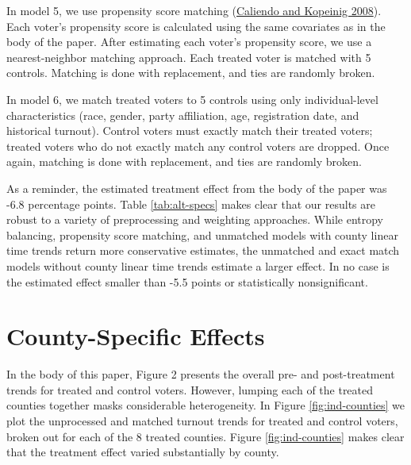 \documentclass[
  12pt,
]{article}
\begin{document}
In model 5, we use propensity score matching (\protect\hyperlink{ref-Caliendo2008}{Caliendo and Kopeinig 2008}). Each voter's propensity score is calculated using the same covariates as in the body of the paper. After estimating each voter's propensity score, we use a nearest-neighbor matching approach. Each treated voter is matched with 5 controls. Matching is done with replacement, and ties are randomly broken.

In model 6, we match treated voters to 5 controls using only individual-level characteristics (race, gender, party affiliation, age, registration date, and historical turnout). Control voters must exactly match their treated voters; treated voters who do not exactly match any control voters are dropped. Once again, matching is done with replacement, and ties are randomly broken.

As a reminder, the estimated treatment effect from the body of the paper was -6.8 percentage points. Table \ref{tab:alt-specs} makes clear that our results are robust to a variety of preprocessing and weighting approaches. While entropy balancing, propensity score matching, and unmatched models with county linear time trends return more conservative estimates, the unmatched and exact match models without county linear time trends estimate a larger effect. In no case is the estimated effect smaller than -5.5 points or statistically nonsignificant.

\newpage
\begin{landscape}
\begin{singlespace}

\end{singlespace}
\end{landscape}

\hypertarget{county-specific-effects}{%
\section*{County-Specific Effects}\label{county-specific-effects}}

In the body of this paper, Figure 2 presents the overall pre- and post-treatment trends for treated and control voters. However, lumping each of the treated counties together masks considerable heterogeneity. In Figure \ref{fig:ind-counties} we plot the unprocessed and matched turnout trends for treated and control voters, broken out for each of the 8 treated counties. Figure \ref{fig:ind-counties} makes clear that the treatment effect varied substantially by county.
\end{document}
